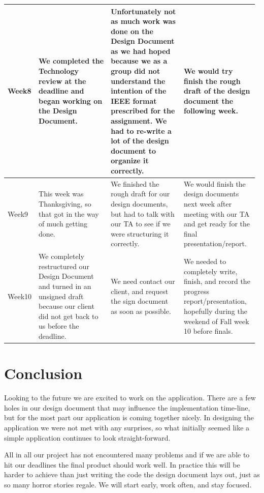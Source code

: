 \begin{longtable}{ | p{0.075\linewidth} | p{0.3\linewidth} | p{0.3\linewidth} | p{0.3\linewidth} |}
  \hline
    Week8 &
  	We completed the Technology review at the deadline and began working on the Design Document. &
  	Unfortunately not as much work was done on the Design Document as we had hoped because we as a group did not understand the intention of the IEEE format prescribed for the assignment. We had to re-write a lot of the design document to organize it correctly. &
    We would try finish the rough draft of the design document the following week. \\
  \hline
    Week9 &
  	This week was Thanksgiving, so that got in the way of much getting done. &
  	We finished the rough draft for our design documents, but had to talk with our TA to see if we were structuring it correctly.&
  	We would finish the design documents next week after meeting with our TA and get ready for the final presentation/report.  \\
  \hline
    Week10 &
  	We completely restructured our Design Document and turned in an unsigned draft because our client did not get back to us before the deadline. &
  	We need contact our client, and request the sign document as soon as possible. &
   	We needed to completely write, finish, and record the progress report/presentation, hopefully during the weekend of Fall week 10 before finals. \\
  \hline
\end{longtable}

\section{Conclusion}

Looking to the future we are excited to work on the application.
There are a few holes in our design document that may influence the implementation time-line, but for the most part our application is coming together nicely.
In designing the application we were not met with any surprises, so what initially seemed like a simple application continues to look straight-forward.

All in all our project has not encountered many problems and if we are able to hit our deadlines the final product should work well.
In practice this will be harder to achieve than just writing the code the design document lays out, just as so many horror stories regale.
We will start early, work often, and stay focused.

\printbibliography


